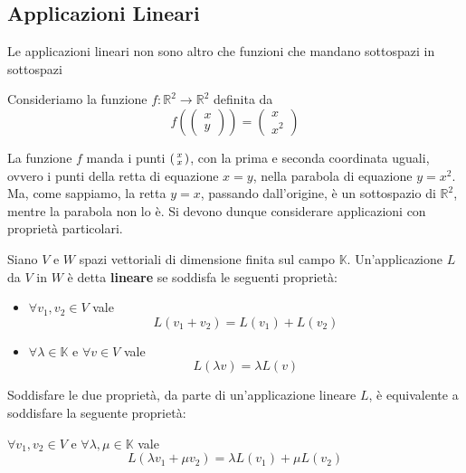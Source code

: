 

\subsection{Applicazioni Lineari}
Le applicazioni lineari non sono altro che funzioni che mandano
sottospazi in sottospazi

\begin{example}
	Consideriamo la funzione $\textit{f} : \mathbb{R}^2 \to \mathbb{R}^2$
	definita da
	\begin{equation*}
		\textit{f}\left(
		\begin{pmatrix}
				x \\ y
			\end{pmatrix}
		\right) =
		\begin{pmatrix}
			x \\ x^2
		\end{pmatrix}
	\end{equation*}

	La funzione $f$ manda i punti
	$\begin{psmallmatrix}
			x \\ x
		\end{psmallmatrix}$,
	con la prima e seconda coordinata uguali, ovvero i punti della retta
	di equazione $x = y$, nella parabola di equazione $y = x^2$.
	Ma, come sappiamo, la retta $y = x$, passando dall'origine, \`e un
	sottospazio di $\mathbb{R}^2$, mentre la parabola non lo \`e.
	Si devono dunque considerare applicazioni con propriet\`a particolari.
\end{example}

\begin{defn}
	Siano $V$ e $W$ spazi vettoriali di dimensione finita sul campo
	$\mathbb{K}$. Un'applicazione $L$ da $V$ in $W$ \`e detta
	\textbf{lineare} se soddisfa le seguenti propriet\`a:
	\begin{itemize}
		\item $\forall v_1, v_2 \in V$ vale \[ L(v_1 + v_2) = L(v_1) + L(v_2) \]
		\item
		      $\forall \lambda \in \mathbb{K}$ e $\forall v \in V$
		      vale \[ L(\lambda v) = \lambda L(v) \]
	\end{itemize}
\end{defn}

\begin{observation}
	Soddisfare le due propriet\`a, da parte di un'applicazione lineare $L$,
	\`e equivalente a soddisfare la seguente propriet\`a:

	$\forall v_1, v_2 \in V$ e $\forall \lambda, \mu \in \mathbb{K}$ vale
	\begin{equation*}
		L(\lambda v_1 + \mu v_2) = \lambda L(v_1) + \mu L(v_2)
	\end{equation*}
\end{observation}

